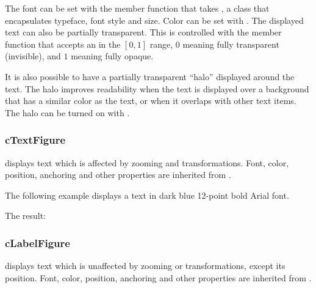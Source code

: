 The font can be set with the  member function that takes
, a class that encapsulates typeface, font style and
size. Color can be set with . The displayed text can
also be partially transparent. This is controlled with the 
member function that accepts an  in the $[0,1]$ range, $0$ meaning
fully transparent (invisible), and $1$ meaning fully opaque.

It is also possible to have a partially transparent ``halo'' displayed around
the text. The halo improves readability when the text is displayed over a
background that has a similar color as the text, or when it overlaps with other
text items. The halo can be turned on with .


\subsubsection{cTextFigure}
\label{sec:graphics:textfigure}

 displays text which is affected by zooming and
transformations. Font, color, position, anchoring and other properties are
inherited from .

The following example displays a text in dark blue 12-point bold Arial
font.



The result:

\begin{center}

\end{center}


\subsubsection{cLabelFigure}
\label{sec:graphics:labelfigure}

 displays text which is unaffected by zooming or
transformations, except its position. Font, color, position, anchoring and
other properties are inherited from .

